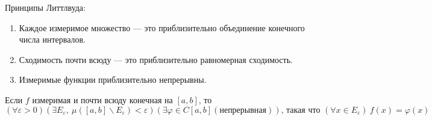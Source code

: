 Принципы Литтлвуда:
\begin{enumerate}
    \item Каждое измеримое множество --- это приблизительно объединение конечного числа интервалов.
    \item Сходимость почти всюду --- это приблизительно равномерная сходимость.
    \item Измеримые функции приблизительно непрерывны.
\end{enumerate}
\begin{theorem}[Н. Н. Лузин]
	Если $f$ измеримая и почти всюду конечная на $[a, b]$, то ${(\forall \varepsilon >0)(\exists E_{\varepsilon},\  \mu([a, b] \backslash E_{\varepsilon})<\varepsilon) (\exists \varphi \in C[a,b](\text{непрерывная}))\text{, такая что }(\forall x \in E_{\varepsilon}) \ f(x)=\varphi(x)}$
\end{theorem}
